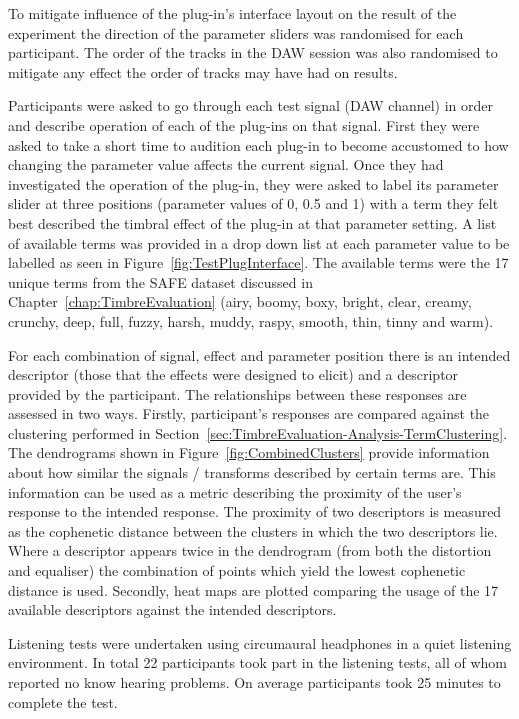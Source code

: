 			To mitigate influence of the plug-in's interface layout on the result of the experiment the
			direction of the parameter sliders was randomised for each participant. The order of the tracks in
			the DAW session was also randomised to mitigate any effect the order of tracks may have had on
			results.

			Participants were asked to go through each test signal (DAW channel) in order and describe
			operation of each of the plug-ins on that signal. First they were asked to take a short time to
			audition each plug-in to become accustomed to how changing the parameter value affects the current
			signal. Once they had investigated the operation of the plug-in, they were asked to label its
			parameter slider at three positions (parameter values of 0, 0.5 and 1) with a term they felt best
			described the timbral effect of the plug-in at that parameter setting. A list of available terms
			was provided in a drop down list at each parameter value to be labelled as seen in
			Figure~\ref{fig:TestPlugInterface}. The available terms were the 17 unique terms from the SAFE
			dataset discussed in Chapter~\ref{chap:TimbreEvaluation} (airy, boomy, boxy, bright, clear, creamy,
			crunchy, deep, full, fuzzy, harsh, muddy, raspy, smooth, thin, tinny and warm).

			For each combination of signal, effect and parameter position there is an intended descriptor
			(those that the effects were designed to elicit) and a descriptor provided by the participant. The
			relationships between these responses are assessed in two ways. Firstly, participant's responses
			are compared against the clustering performed in
			Section~\ref{sec:TimbreEvaluation-Analysis-TermClustering}. The dendrograms shown in
			Figure~\ref{fig:CombinedClusters} provide information about how similar the signals / transforms
			described by certain terms are. This information can be used as a metric describing the proximity
			of the user's response to the intended response. The proximity of two descriptors is measured as
			the cophenetic distance between the clusters in which the two descriptors lie. Where a descriptor
			appears twice in the dendrogram (from both the distortion and equaliser) the combination of points
			which yield the lowest cophenetic distance is used. Secondly, heat maps are plotted comparing the
			usage of the 17 available descriptors against the intended descriptors.

			Listening tests were undertaken using circumaural headphones in a quiet listening environment. In
			total 22 participants took part in the listening tests, all of whom reported no know hearing
			problems. On average participants took 25 minutes to complete the test.

